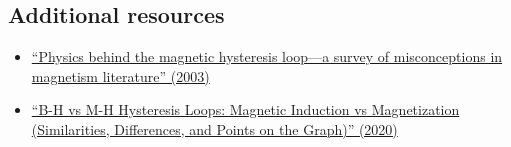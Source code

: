 \documentclass[letterpaper, 12pt]{article}
\begin{document}
\subsection*{Additional resources}

\begin{itemize}
    \setlength\itemsep{-0.5em}
    \item \href{https://doi.org/10.1016/S0304-8853(02)01339-2}{``Physics behind the magnetic hysteresis loop—a survey of misconceptions in magnetism literature'' (2003)}
    \item \href{https://msestudent.com/b-h-vs-m-h-hysteresis-loops-magnetic-induction-vs-magnetization-similarities-differences-and-points-on-the-graph/}{``B-H vs M-H Hysteresis Loops: Magnetic Induction vs Magnetization (Similarities, Differences, and Points on the Graph)'' (2020)}
\end{itemize}
\end{document}
